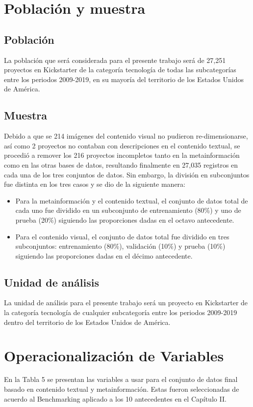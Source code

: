 \section{Población y muestra}

\subsection{Población}
La población que será considerada para el presente trabajo será de 27,251 proyectos en Kickstarter de la categoría tecnología de todas las subcategorías entre los periodos 2009-2019, en su mayoría del territorio de los Estados Unidos de América.

\subsection{Muestra}
Debido a que se 214 imágenes del contenido visual no pudieron re-dimensionarse, así como 2 proyectos no contaban con descripciones en el contenido textual, se procedió a remover los 216 proyectos incompletos tanto en la metainformación como en las otras bases de datos, resultando finalmente en 27,035 registros en cada una de los tres conjuntos de datos. Sin embargo, la división en subconjuntos fue distinta en los tres casos y se dio de la siguiente manera:

\begin{itemize}
	\item Para la metainformación y el contenido textual, el conjunto de datos total de cada uno fue dividido en un subconjunto de entrenamiento (80\%) y uno de prueba (20\%) siguiendo las proporciones dadas en el octavo antecedente.
	\item Para el contenido visual, el conjunto de datos total fue dividido en tres subconjuntos: entrenamiento (80\%), validación (10\%) y prueba (10\%) siguiendo las proporciones dadas en el décimo antecedente.
\end{itemize}

\subsection{Unidad de análisis}
La unidad de análisis para el presente trabajo será un proyecto en Kickstarter de la categoría tecnología de cualquier subcategoría entre los periodos 2009-2019 dentro del territorio de los Estados Unidos de América.

\section{Operacionalización de Variables}
En la Tabla 5 se presentan las variables a usar para el conjunto de datos final basado en contenido textual y metainformación. Estas fueron seleccionadas de acuerdo al Benchmarking aplicado a los 10 antecedentes en el Capítulo II.

